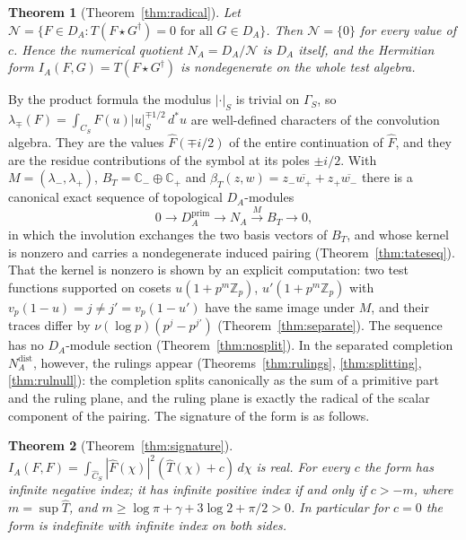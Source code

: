 \documentclass[11pt]{amsart}
\newtheorem{theorem}{Theorem}[section]
\theoremstyle{definition}
\theoremstyle{remark}
\newcommand{\C}{\mathbb C}
\newcommand{\Z}{\mathbb Z}
\newcommand{\dstar}{\,d^{*}}
\newcommand{\Nrad}{\mathcal N}
\begin{document}
\begin{theorem}[Theorem~\ref{thm:radical}]\label{thm:introC}
Let $\Nrad=\{F\in D_A: T(F\star G^{\dagger})=0\text{ for all }G\in D_A\}$.
Then $\Nrad=\{0\}$ for every value of $c$.  Hence the numerical quotient
$N_A=D_A/\Nrad$ is $D_A$ itself, and the Hermitian form
$I_A(F,G)=T(F\star G^{\dagger})$ is nondegenerate on the whole test algebra.
\end{theorem}

By the product formula the modulus $|\cdot|_S$ is trivial on $\Gamma_S$, so
$\lambda_{\mp}(F)=\int_{C_S}F(u)|u|_S^{\mp1/2}\dstar u$ are well-defined
characters of the convolution algebra.  They are the values $\widehat
F(\mp i/2)$ of the entire continuation of $\widehat F$, and they are the
residue contributions of the symbol at its poles $\pm i/2$.  With
$M=(\lambda_-,\lambda_+)$, $B_T=\C_-\oplus\C_+$ and
$\beta_T(z,w)=z_-\overline{w_+}+z_+\overline{w_-}$ there is a canonical exact
sequence of topological $D_A$-modules
\[
0\longrightarrow D_A^{\mathrm{prim}}\longrightarrow N_A
\stackrel{M}{\longrightarrow}B_T\longrightarrow 0,
\]
in which the involution exchanges the two basis vectors of $B_T$, and whose
kernel is nonzero and carries a nondegenerate induced pairing
(Theorem~\ref{thm:tateseq}).  That the kernel is nonzero is shown by an
explicit computation: two test functions supported on cosets
$u(1+p^m\Z_p)$, $u'(1+p^m\Z_p)$ with $v_p(1-u)=j\ne j'=v_p(1-u')$ have the
same image under $M$, and their traces differ by $\nu(\log p)(p^{j}-p^{j'})$
(Theorem~\ref{thm:separate}).  The sequence has no $D_A$-module section
(Theorem~\ref{thm:nosplit}).  In the separated completion
$N_A^{\mathrm{dist}}$, however, the rulings appear
(Theorems~\ref{thm:rulings}, \ref{thm:splitting}, \ref{thm:rulnull}): the
completion splits canonically as the sum of a primitive part and the ruling
plane, and the ruling plane is exactly the radical of the scalar component of
the pairing.  The signature of the form is as follows.

\begin{theorem}[Theorem~\ref{thm:signature}]\label{thm:introD}
$I_A(F,F)=\int_{\widehat C_S}|\widehat F(\chi)|^{2}(\widehat T(\chi)+c)\,
d\chi$ is real.  For every $c$ the form has infinite negative index; it has
infinite positive index if and only if $c>-m$, where $m=\sup\widehat T$, and
$m\ge\log\pi+\gamma+3\log2+\pi/2>0$.  In particular for $c=0$ the form is
indefinite with infinite index on both sides.
\end{theorem}
\end{document}
